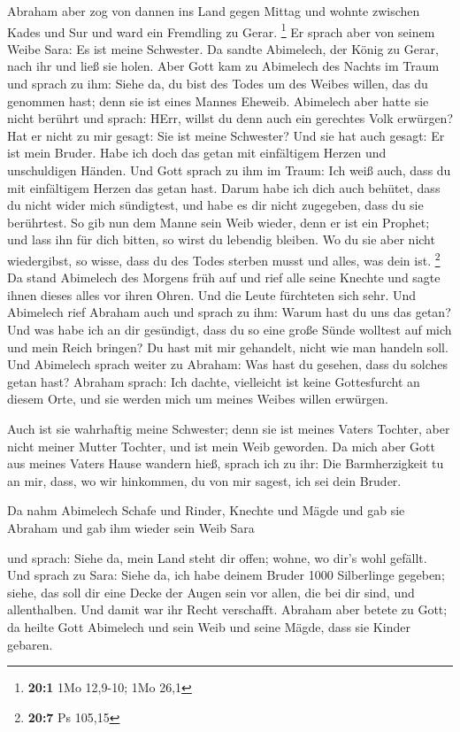  Abraham aber zog von dannen ins Land gegen Mittag und
wohnte zwischen Kades und Sur und ward ein Fremdling zu Gerar.
\footnote{\textbf{20:1} 1Mo 12,9-10; 1Mo 26,1}  Er sprach
aber von seinem Weibe Sara: Es ist meine Schwester. Da sandte Abimelech,
der König zu Gerar, nach ihr und ließ sie holen.  Aber Gott
kam zu Abimelech des Nachts im Traum und sprach zu ihm: Siehe da, du
bist des Todes um des Weibes willen, das du genommen hast; denn sie ist
eines Mannes Eheweib.  Abimelech aber hatte sie nicht
berührt und sprach: HErr, willst du denn auch ein gerechtes Volk
erwürgen?  Hat er nicht zu mir gesagt: Sie ist meine
Schwester? Und sie hat auch gesagt: Er ist mein Bruder. Habe ich doch
das getan mit einfältigem Herzen und unschuldigen Händen. 
Und Gott sprach zu ihm im Traum: Ich weiß auch, dass du mit einfältigem
Herzen das getan hast. Darum habe ich dich auch behütet, dass du nicht
wider mich sündigtest, und habe es dir nicht zugegeben, dass du sie
berührtest.  So gib nun dem Manne sein Weib wieder, denn er
ist ein Prophet; und lass ihn für dich bitten, so wirst du lebendig
bleiben. Wo du sie aber nicht wiedergibst, so wisse, dass du des Todes
sterben musst und alles, was dein ist. \footnote{\textbf{20:7} Ps 105,15}
 Da stand Abimelech des Morgens früh auf und rief alle seine
Knechte und sagte ihnen dieses alles vor ihren Ohren. Und die Leute
fürchteten sich sehr.  Und Abimelech rief Abraham auch und
sprach zu ihm: Warum hast du uns das getan? Und was habe ich an dir
gesündigt, dass du so eine große Sünde wolltest auf mich und mein Reich
bringen? Du hast mit mir gehandelt, nicht wie man handeln soll.
 Und Abimelech sprach weiter zu Abraham: Was hast du
gesehen, dass du solches getan hast?  Abraham sprach: Ich
dachte, vielleicht ist keine Gottesfurcht an diesem Orte, und sie werden
mich um meines Weibes willen erwürgen.

 Auch ist sie wahrhaftig meine Schwester; denn sie ist
meines Vaters Tochter, aber nicht meiner Mutter Tochter, und ist mein
Weib geworden.  Da mich aber Gott aus meines Vaters Hause
wandern hieß, sprach ich zu ihr: Die Barmherzigkeit tu an mir, dass, wo
wir hinkommen, du von mir sagest, ich sei dein Bruder.

 Da nahm Abimelech Schafe und Rinder, Knechte und Mägde und
gab sie Abraham und gab ihm wieder sein Weib Sara

 und sprach: Siehe da, mein Land steht dir offen; wohne, wo
dir's wohl gefällt.  Und sprach zu Sara: Siehe da, ich habe
deinem Bruder 1000 Silberlinge gegeben; siehe, das soll dir eine Decke
der Augen sein vor allen, die bei dir sind, und allenthalben. Und damit
war ihr Recht verschafft.  Abraham aber betete zu Gott; da
heilte Gott Abimelech und sein Weib und seine Mägde, dass sie Kinder
gebaren.

